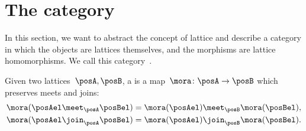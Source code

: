 \section[The category \Lat]{The category~\Lat}
In this section, we want to abstract the concept of lattice and describe a category in which the objects are lattices themselves, and the morphisms are lattice homomorphisms.
We call this category~\Lat.

\begin{ctdefinition}
    \label{def:lattice_homomorphism}
    Given two lattices~$\posA, \posB$, a \emph{} is a map~$\mora\colon \posA\to \posB$ which preserves meets and joins:
    \begin{equation}
        \begin{aligned}
            \mora(\posAel \meet_\posA \posBel) & = \mora(\posAel) \meet_\posB \mora(\posBel), \\
            \mora(\posAel \join_\posA \posBel) & = \mora(\posAel) \join_\posB \mora(\posBel).
        \end{aligned}
    \end{equation}
\end{ctdefinition}


